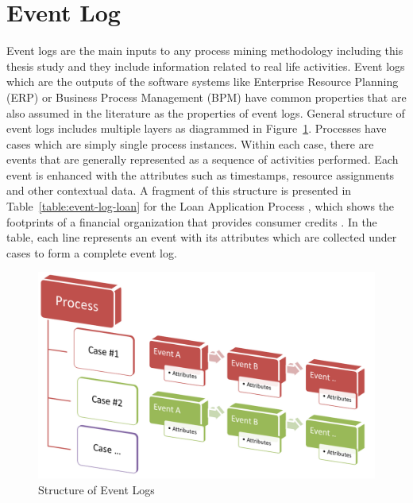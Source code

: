 \section{Event Log}
\label{sec:event-log}
Event logs are the main inputs to any process mining methodology including this thesis study and they include information related to real life activities. Event logs which are the outputs of the software systems like Enterprise Resource Planning (ERP) or Business Process Management (BPM) have common properties that are also assumed in the literature as the properties of event logs. General structure of event logs includes multiple layers as diagrammed in Figure~\ref{fig:event-log-structure}. Processes have cases which are simply single process instances. Within each case, there are events that are generally represented as a sequence of activities performed. Each event is enhanced with the attributes such as timestamps, resource assignments and other contextual data. A fragment of this structure is presented in Table~\ref{table:event-log-loan} for the Loan Application Process \cite{loan-app-data}, which shows the footprints of a financial organization that provides consumer credits \cite{buijs2013improving}. In the table, each line represents an event with its attributes which are collected under cases to form a complete event log. 
\begin{figure}
  \centering
  \includegraphics[width=\textwidth]{3_background/event_log_structure}
  \caption{Structure of Event Logs}
  \label{fig:event-log-structure}
\end{figure}

